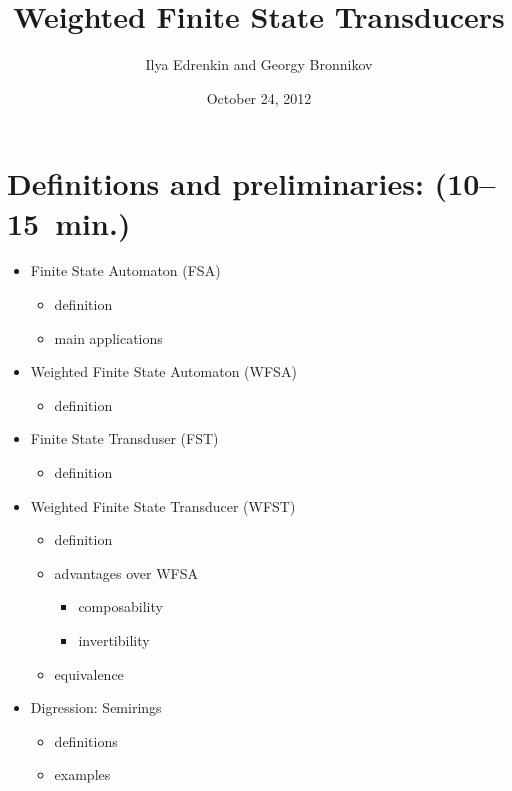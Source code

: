 \documentclass{beamer}
\title{Weighted Finite State Transducers}
\author{Ilya Edrenkin and Georgy Bronnikov}
\date{October 24, 2012}
\newcommand{\<}{\langle}
\renewcommand{\>}{\rangle}
\begin{document}
\maketitle

\section{Definitions and preliminaries: (10--15~min.)}

\begin{frame}
  \begin{itemize}
  \item Finite State Automaton (FSA)
    \begin{itemize}
    \item definition
    \item main applications
    \end{itemize}
  \item Weighted Finite State Automaton (WFSA)
    \begin{itemize}
    \item definition
    \end{itemize}
  \item Finite State Transduser (FST)
    \begin{itemize}
    \item definition
    \end{itemize}
  \item Weighted Finite State Transducer (WFST)
    \begin{itemize}
    \item definition
    \item advantages over WFSA
      \begin{itemize}
      \item composability
      \item invertibility
      \end{itemize}
    \item equivalence
    \end{itemize}
  \item Digression: Semirings
    \begin{itemize}
    \item definitions
    \item examples
    \end{itemize}
  \end{itemize}
\end{frame}
\end{document}
